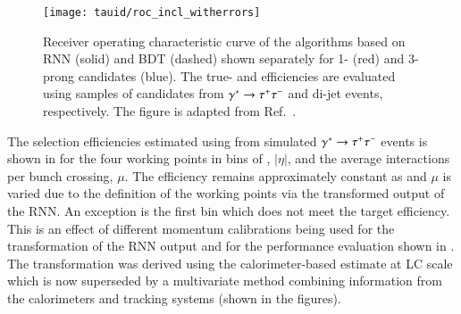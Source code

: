\begin{figure}[htbp]
  \centering

  \texttt{[image: tauid/roc\_incl\_witherrors]}

  \caption{Receiver operating characteristic curve of the \tauid
    algorithms based on RNN (solid) and BDT (dashed) shown separately
    for 1- (red) and 3-prong candidates (blue). The true- and
    \faketauhadvis efficiencies are evaluated using samples of
    \tauhadvis candidates from $\gamma^{*} \to \tau^{+} \tau^{-}$ and di-jet
    events, respectively.  The figure is adapted from
    Ref.~\cite{ATL-PHYS-PUB-2019-033}.}%
  \label{fig:tauid_rnn_bdt_roc_comparison}
\end{figure}

The \truetauhadvis selection efficiencies estimated using \tauhadvis
from simulated $\gamma^{*} \to \tau^{+} \tau^{-}$ events is shown in
 for the four working points in bins of
\tauhadvis \pT, \tauhadvis $|\eta|$, and the average interactions per
bunch crossing, $\mu$. The efficiency remains approximately constant
as \tauhadvis \pT and $\mu$ is varied due to the definition of the
working points via the transformed output of the RNN. An exception is
the first \tauhadvis \pT bin which does not meet the target
efficiency. This is an effect of different \tauhadvis momentum
calibrations being used for the transformation of the RNN output and
for the performance evaluation shown in
. The
transformation was derived using the calorimeter-based \tauhadvis \pT
estimate at LC scale which is now superseded by a multivariate method
combining information from the calorimeters and tracking systems
(shown in the figures).

